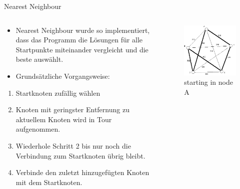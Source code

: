 \begin{frame}{Nearest Neighbour}
\begin{columns}
		\begin{column}{0.6\textwidth}
	\begin{itemize}
		\item Nearest Neighbour wurde so implementiert, dass das Programm die Lösungen für alle Startpunkte miteinander vergleicht und die beste auswählt.
        \item Grundsätzliche Vorgangsweise:
    \end{itemize}
    \begin{enumerate}
     	\item Startknoten zufällig wählen
        \item Knoten mit geringster Entfernung zu aktuellem Knoten wird in Tour aufgenommen.
        \item Wiederhole Schritt 2 bis nur noch die Verbindung zum Startknoten übrig bleibt.
        \item Verbinde den zuletzt hinzugefügten Knoten mit dem Startknoten.
	\end{enumerate}
    	\end{column}
        \begin{column}{0.4\textwidth}
        \begin{figure} 
        	\includegraphics[scale=0.30]{NN.png}
            starting in node A
        \end{figure}
  	  \end{column}
  \end{columns}
\end{frame}

